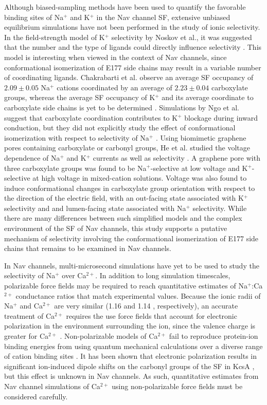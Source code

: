 \begin{refsection}
Although biased-sampling methods have been used to quantify the favorable binding sites of Na$^{+}$ and K$^{+}$ in the Nav channel SF, extensive unbiased equilibrium simulations have not been performed in the study of ionic selectivity.  In the field-strength model of K$^{+}$ selectivity by Noskov et al., it was suggested that the number and the type of ligands could directly influence selectivity \cite{Noskov:2006fd,Noskov:2004tv}. This model is interesting when viewed in the context of Nav channels, since conformational isomerization of E177 side chains may result in a variable number of coordinating ligands.  Chakrabarti et al. observe an average SF occupancy of $2.09 \pm 0.05$ Na$^{+}$ cations coordinated by an average of $2.23 \pm 0.04$ carboxylate groups, whereas the average SF occupancy of K$^{+}$ and its average coordinate to carboxylate side chains is yet to be determined \cite{Chakrabarti:2013kd}.  Simulations by Ngo et al. suggest that carboxylate coordination contributes to K$^{+}$ blockage during inward conduction, but they did not explicitly study the effect of conformational isomerization with respect to selectivity of Na$^{+}$ \cite{Ngo:2016es}.  Using biomimetic graphene pores containing carboxylate or carbonyl groups, He et al. studied the voltage dependence of Na$^{+}$ and K$^{+}$ currents as well as selectivity \cite{He:2013it}.  A graphene pore with three carboxylate groups was found to be Na$^{+}$-selective at low voltage and K$^{+}$-selective at high voltage in mixed-cation solutions.  Voltage was also found to induce conformational changes in carboxylate group orientation with respect to the direction of the electric field, with an out-facing state associated with K$^{+}$ selectivity and and lumen-facing state associated with Na$^{+}$ selectivity.  While there are many differences between such simplified models and the complex environment of the SF of Nav channels, this study supports a putative mechanism of selectivity involving the conformational isomerization of E177 side chains that remains to be examined in Nav channels.
 
 In Nav channels, multi-microsecond simulations have yet to be used to study the selectivity of Na$^{+}$ over Ca$^{2+}$. In addition to long simulation timescales, polarizable force fields may be required to reach quantitative estimates of Na$^{+}$:Ca$^{2+}$ conductance ratios that match experimental values.  Because the ionic radii of Na$^{+}$ and Ca$^{2+}$ are very similar (1.16 \angstrom and 1.14 \angstrom, respectively), an accurate treatment of Ca$^{2+}$ requires the use force fields that account for electronic polarization in the environment surrounding the ion, since the valence charge is greater for Ca$^{2+}$ \cite{Huang:2014ia}. Non-polarizable models of Ca$^{2+}$ fail to reproduce protein-ion binding energies from using quantum mechanical calculations over a diverse range of cation binding sites \cite{Ngo:2015ki}. It has been shown that electronic polarization results in significant ion-induced dipole shifts on the carbonyl groups of the SF in KcsA \cite{Allen:2006jw,Bucher:2009ef}, but this effect is unknown in Nav channels.  As such, quantitative estimates from Nav channel simulations of Ca$^{2+}$ using non-polarizable force fields must be considered carefully.
 

\end{refsection}
